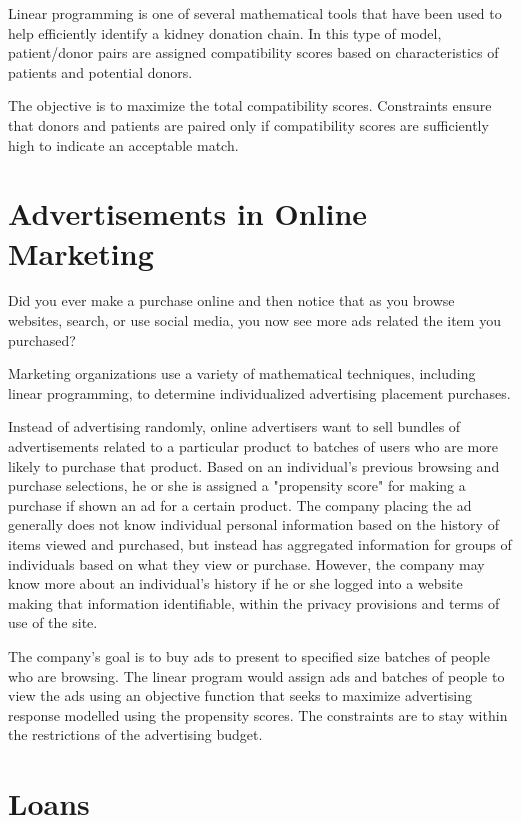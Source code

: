 Linear programming is one of several mathematical tools that have been used to help efficiently identify a kidney donation chain. In this type of model, patient/donor pairs are assigned compatibility scores based on characteristics of patients and potential donors.

The objective is to maximize the total compatibility scores. Constraints ensure that donors and patients are paired only if compatibility scores are sufficiently high to indicate an acceptable match.

\section*{Advertisements in Online Marketing}

Did you ever make a purchase online and then notice that as you browse websites, search, or use social media, you now see more ads related the item you purchased?

Marketing organizations use a variety of mathematical techniques, including linear programming, to determine individualized advertising placement purchases.

Instead of advertising randomly, online advertisers want to sell bundles of advertisements related to a particular product to batches of users who are more likely to purchase that product. Based on an individual's previous browsing and purchase selections, he or she is assigned a "propensity score" for making a purchase if shown an ad for a certain product. The company placing the ad generally does not know individual personal information based on the history of items viewed and purchased, but instead has aggregated information for groups of individuals based on what they view or purchase. However, the company may know more about an individual's history if he or she logged into a website making that information identifiable, within the privacy provisions and terms of use of the site.

The company's goal is to buy ads to present to specified size batches of people who are browsing. The linear program would assign ads and batches of people to view the ads using an objective function that seeks to maximize advertising response modelled using the propensity scores. The constraints are to stay within the restrictions of the advertising budget.

\section*{Loans}

